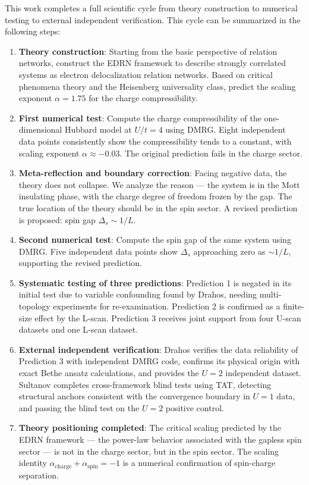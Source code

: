 \documentclass[prb,reprint,twocolumn,superscriptaddress]{revtex4-2}
\begin{document}
This work completes a full scientific cycle from theory construction to numerical testing to external independent verification. This cycle can be summarized in the following steps:

\begin{enumerate}
\item \textbf{Theory construction}: Starting from the basic perspective of relation networks, construct the EDRN framework to describe strongly correlated systems as electron delocalization relation networks. Based on critical phenomena theory and the Heisenberg universality class, predict the scaling exponent $\alpha = 1.75$ for the charge compressibility.
\item \textbf{First numerical test}: Compute the charge compressibility of the one-dimensional Hubbard model at $U/t = 4$ using DMRG. Eight independent data points consistently show the compressibility tends to a constant, with scaling exponent $\alpha \approx -0.03$. The original prediction fails in the charge sector.
\item \textbf{Meta-reflection and boundary correction}: Facing negative data, the theory does not collapse. We analyze the reason --- the system is in the Mott insulating phase, with the charge degree of freedom frozen by the gap. The true location of the theory should be in the spin sector. A revised prediction is proposed: spin gap $\Delta_s \sim 1/L$.
\item \textbf{Second numerical test}: Compute the spin gap of the same system using DMRG. Five independent data points show $\Delta_s$ approaching zero as $\sim 1/L$, supporting the revised prediction.
\item \textbf{Systematic testing of three predictions}: Prediction 1 is negated in its initial test due to variable confounding found by Drahos, needing multi-topology experiments for re-examination. Prediction 2 is confirmed as a finite-size effect by the L-scan. Prediction 3 receives joint support from four U-scan datasets and one L-scan dataset.
\item \textbf{External independent verification}: Drahos verifies the data reliability of Prediction 3 with independent DMRG code, confirms its physical origin with exact Bethe ansatz calculations, and provides the $U=2$ independent dataset. Sultanov completes cross-framework blind tests using TAT, detecting structural anchors consistent with the convergence boundary in $U=1$ data, and passing the blind test on the $U=2$ positive control.
\item \textbf{Theory positioning completed}: The critical scaling predicted by the EDRN framework --- the power-law behavior associated with the gapless spin sector --- is not in the charge sector, but in the spin sector. The scaling identity $\alpha_{\mathrm{charge}} + \alpha_{\mathrm{spin}} = -1$ is a numerical confirmation of spin-charge separation.
\end{enumerate}
\end{document}
